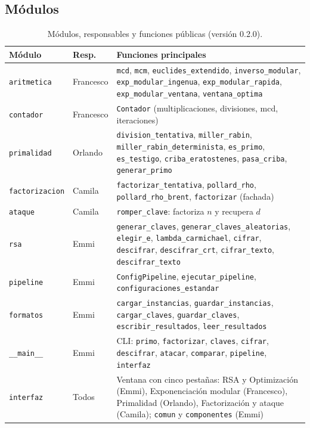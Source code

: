 \subsection{Módulos}

\begin{table}[H]
\centering\small
\caption{Módulos, responsables y funciones públicas (versión 0.2.0).}
\label{tab:modulos}
\begin{tabularx}{\textwidth}{@{}l l Y@{}}
\toprule
\textbf{Módulo} & \textbf{Resp.} & \textbf{Funciones principales}\\
\midrule
\texttt{aritmetica} & Francesco & \texttt{mcd}, \texttt{mcm}, \texttt{euclides\_extendido}, \texttt{inverso\_modular}, \texttt{exp\_modular\_ingenua}, \texttt{exp\_modular\_rapida}, \texttt{exp\_modular\_ventana}, \texttt{ventana\_optima}\\
\texttt{contador} & Francesco & \texttt{Contador} (multiplicaciones, divisiones, mcd, iteraciones)\\
\texttt{primalidad} & Orlando & \texttt{division\_tentativa}, \texttt{miller\_rabin}, \texttt{miller\_rabin\_determinista}, \texttt{es\_primo}, \texttt{es\_testigo}, \texttt{criba\_eratostenes}, \texttt{pasa\_criba}, \texttt{generar\_primo}\\
\texttt{factorizacion} & Camila & \texttt{factorizar\_tentativa}, \texttt{pollard\_rho}, \texttt{pollard\_rho\_brent}, \texttt{factorizar} (fachada)\\
\texttt{ataque} & Camila & \texttt{romper\_clave}: factoriza $n$ y recupera $d$\\
\texttt{rsa} & Emmi & \texttt{generar\_claves}, \texttt{generar\_claves\_aleatorias}, \texttt{elegir\_e}, \texttt{lambda\_carmichael}, \texttt{cifrar}, \texttt{descifrar}, \texttt{descifrar\_crt}, \texttt{cifrar\_texto}, \texttt{descifrar\_texto}\\
\texttt{pipeline} & Emmi & \texttt{ConfigPipeline}, \texttt{ejecutar\_pipeline}, \texttt{configuraciones\_estandar}\\
\texttt{formatos} & Emmi & \texttt{cargar\_instancias}, \texttt{guardar\_instancias}, \texttt{cargar\_claves}, \texttt{guardar\_claves}, \texttt{escribir\_resultados}, \texttt{leer\_resultados}\\
\texttt{\_\_main\_\_} & Emmi & CLI: \texttt{primo}, \texttt{factorizar}, \texttt{claves}, \texttt{cifrar}, \texttt{descifrar}, \texttt{atacar}, \texttt{comparar}, \texttt{pipeline}, \texttt{interfaz}\\
\texttt{interfaz} & Todos & Ventana con cinco pestañas: RSA y Optimización (Emmi), Exponenciación modular (Francesco), Primalidad (Orlando), Factorización y ataque (Camila); \texttt{comun} y \texttt{componentes} (Emmi)\\
\bottomrule
\end{tabularx}
\end{table}

